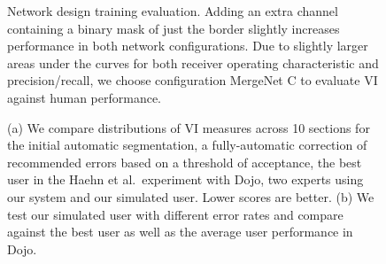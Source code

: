 \begin{figure}[ht]
 \caption{Network design training evaluation. Adding an extra channel containing a binary mask of just the border slightly increases performance in both network configurations. Due to slightly larger areas under the curves for both receiver operating characteristic and precision/recall, we choose configuration MergeNet C to evaluate VI against human performance.}
 \label{fig:trainingperformance}
\end{figure}


\begin{figure}[t]
 \centering
    \hfill

\caption{(a) We compare distributions of VI measures across 10 sections for the initial automatic segmentation, a fully-automatic correction of recommended errors based on a threshold of acceptance, the best user in the Haehn et al.~experiment with Dojo, two experts using our system and our simulated user. Lower scores are better. (b) We test our simulated user with different error rates and compare against the best user as well as the average user performance in Dojo.}
\label{fig:results}

\end{figure}



